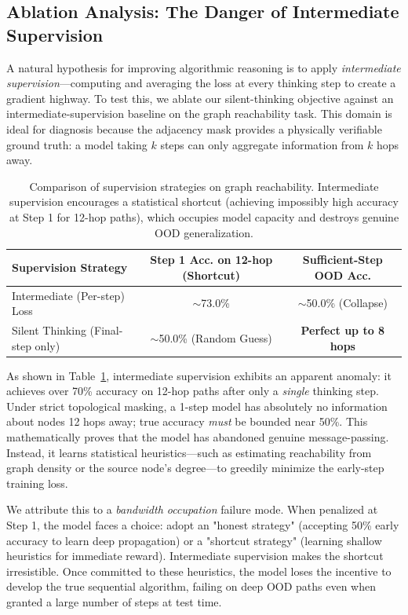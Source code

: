 \subsection{Ablation Analysis: The Danger of Intermediate Supervision}
\label{sec:ablation}

A natural hypothesis for improving algorithmic reasoning is to apply \emph{intermediate supervision}---computing and averaging the loss at every thinking step to create a gradient highway. To test this, we ablate our silent-thinking objective against an intermediate-supervision baseline on the graph reachability task. This domain is ideal for diagnosis because the adjacency mask provides a physically verifiable ground truth: a model taking $k$ steps can only aggregate information from $k$ hops away. 

\begin{table}[tb]
    \centering
    \caption{Comparison of supervision strategies on graph reachability. Intermediate supervision encourages a statistical shortcut (achieving impossibly high accuracy at Step 1 for 12-hop paths), which occupies model capacity and destroys genuine OOD generalization.}
    \label{tab:ablation-inter}
    \begin{tabular}{lcc}
        \toprule
        \textbf{Supervision Strategy} & \textbf{Step 1 Acc. on 12-hop (Shortcut)} & \textbf{Sufficient-Step OOD Acc.} \\
        \midrule
        Intermediate (Per-step) Loss & $\sim$73.0\% & $\sim$50.0\% (Collapse) \\
        Silent Thinking (Final-step only) & $\sim$50.0\% (Random Guess) & \textbf{Perfect up to 8 hops} \\
        \bottomrule
    \end{tabular}
\end{table}

As shown in Table~\ref{tab:ablation-inter}, intermediate supervision exhibits an apparent anomaly: it achieves over 70\% accuracy on 12-hop paths after only a \emph{single} thinking step. Under strict topological masking, a 1-step model has absolutely no information about nodes 12 hops away; true accuracy \emph{must} be bounded near 50\%. This mathematically proves that the model has abandoned genuine message-passing. Instead, it learns statistical heuristics---such as estimating reachability from graph density or the source node's degree---to greedily minimize the early-step training loss.

We attribute this to a \emph{bandwidth occupation} failure mode. When penalized at Step 1, the model faces a choice: adopt an "honest strategy" (accepting 50\% early accuracy to learn deep propagation) or a "shortcut strategy" (learning shallow heuristics for immediate reward). Intermediate supervision makes the shortcut irresistible. Once committed to these heuristics, the model loses the incentive to develop the true sequential algorithm, failing on deep OOD paths even when granted a large number of steps at test time.


